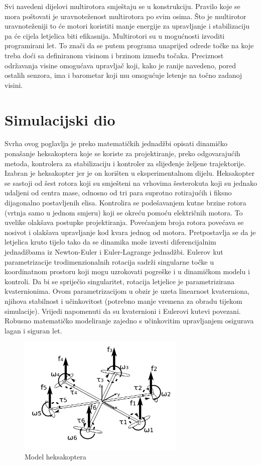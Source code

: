 \documentclass[times, utf8, diplomski]{fer}
\begin{document}
Svi navedeni dijelovi multirotora smještaju se u konstrukciju. Pravilo koje se  mora poštovati je uravnoteženost multirotora po svim osima. Što je multirotor uravnoteženiji to će motori koristiti manje energije za upravljanje i stabilizaciju pa će cijela letjelica biti efikasnija. Multirotori su u mogućnosti izvoditi programirani let. To znači da se putem programa unaprijed odrede točke na koje treba doći sa definiranom visinom i brzinom između točaka. Preciznost održavanja visine omogućava upravljač koji,  kako  je  ranije  navedeno,  pored  ostalih  senzora, ima i  barometar koji mu omogućuje letenje na  točno zadanoj  visini. \citep{Zilic}
\section{Simulacijski dio}\label{sec:SimulacijskiDio}
Svrha ovog poglavlja je preko matematičkih jednadžbi opisati dinamičko ponašanje heksakoptera koje se koriste za projektiranje, preko odgovarajućih metoda, kontrolera  za stabilizaciju i kontroler za slijeđenje željene trajektorije. Izabran je heksakopter jer je on korišten u eksperimentalnom dijelu. Heksakopter se sastoji od šest rotora koji su smješteni na vrhovima šesterokuta koji su jednako udaljeni od centra mase, odnosno od tri para suprotno rotirajućih i fiksno dijagonalno postavljenih elisa.  Kontrolira se podešavanjem kutne brzine rotora (vrtnja samo u jednom smjeru) koji se okreću pomoću električnih motora. To uvelike olakšava postupke projektiranja. Povećanjem broja rotora povećava se nosivot i olakšava upravljanje kod kvara jednog od motora. Pretpostavlja se da je letjelica kruto tijelo tako da se dinamika može izvesti diferencijalnim jednadžbama iz Newton-Euler i Euler-Lagrange jednadžbi. Eulerov kut parametrizacije trodimenzionalnih rotacija sadrži singularne točke u koordinatnom prostoru koji mogu uzrokovati pogreške i u dinamičkom modelu i kontroli. Da bi se spriječio singularitet, rotacija letjelice je parametrizirana kvaternionima. Ovom parametrizacijom u obzir je uzeta linearnost kvaterniona, njihova stabilnost i učinkovitost (potrebno manje vremena za obradu tijekom simulacije). Vrijedi napomenuti da su kvaternioni i Eulerovi kutevi povezani. Robusno matematičko modeliranje zajedno s učinkovitim upravljanjem osigurava lagan i siguran let. \citep{MathematicalModeling}
\begin{figure}[htb]
\centering
\includegraphics[width=8cm]{img/model_hexcopter.png}
\caption{Model heksakoptera\protect\footnotemark}
\label{fig:model}
\end{figure}
\end{document}
